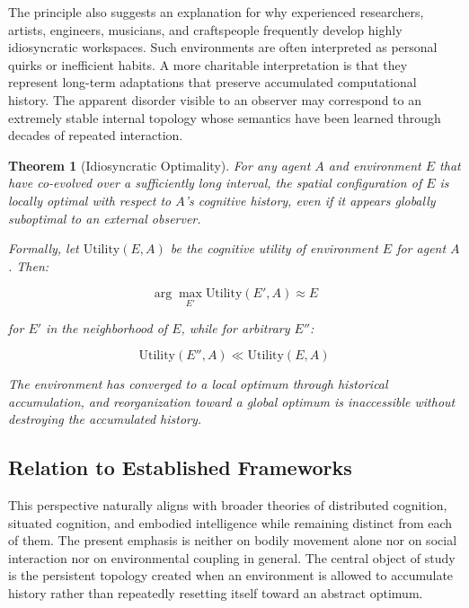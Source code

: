 \documentclass[12pt,oneside]{article}
\newtheorem{theorem}[definition]{Theorem}
\theoremstyle{remark}
\begin{document}
The principle also suggests an explanation for why experienced researchers, artists, engineers, musicians, and craftspeople frequently develop highly idiosyncratic workspaces. Such environments are often interpreted as personal quirks or inefficient habits. A more charitable interpretation is that they represent long-term adaptations that preserve accumulated computational history. The apparent disorder visible to an observer may correspond to an extremely stable internal topology whose semantics have been learned through decades of repeated interaction.

\begin{theorem}[Idiosyncratic Optimality]
For any agent $A$ and environment $E$ that have co-evolved over a sufficiently long interval, the spatial configuration of $E$ is locally optimal with respect to $A$'s cognitive history, even if it appears globally suboptimal to an external observer.

Formally, let $\text{Utility}(E, A)$ be the cognitive utility of environment $E$ for agent $A$. Then:

\begin{equation}
\arg\max_{E'} \text{Utility}(E', A) \approx E
\end{equation}

for $E'$ in the neighborhood of $E$, while for arbitrary $E''$:

\begin{equation}
\text{Utility}(E'', A) \ll \text{Utility}(E, A)
\end{equation}

The environment has converged to a local optimum through historical accumulation, and reorganization toward a global optimum is inaccessible without destroying the accumulated history.
\end{theorem}

\subsection{Relation to Established Frameworks}

This perspective naturally aligns with broader theories of distributed cognition, situated cognition, and embodied intelligence while remaining distinct from each of them. The present emphasis is neither on bodily movement alone nor on social interaction nor on environmental coupling in general. The central object of study is the persistent topology created when an environment is allowed to accumulate history rather than repeatedly resetting itself toward an abstract optimum.
\end{document}
